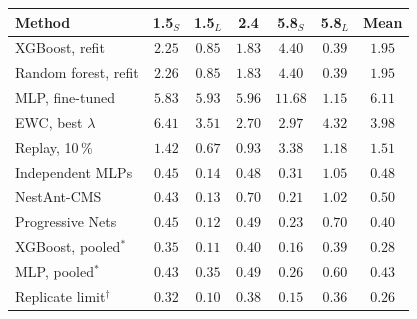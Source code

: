 \begin{tabular}{@{}lcccccc@{}}
\toprule
Method & 1.5$_S$ & 1.5$_L$ & 2.4 & 5.8$_S$ & 5.8$_L$ & Mean \\
\midrule
XGBoost, refit & $2.25$ & $0.85$ & $1.83$ & $4.40$ & $0.39$ & $1.95$ \\
Random forest, refit & $2.26$ & $0.85$ & $1.83$ & $4.40$ & $0.39$ & $1.95$ \\
MLP, fine-tuned & $5.83$ & $5.93$ & $5.96$ & $11.68$ & $1.15$ & $6.11$ \\
EWC, best $\lambda$ & $6.41$ & $3.51$ & $2.70$ & $2.97$ & $4.32$ & $3.98$ \\
Replay, 10\,\% & $1.42$ & $0.67$ & $0.93$ & $3.38$ & $1.18$ & $1.51$ \\
Independent MLPs & $0.45$ & $0.14$ & $0.48$ & $0.31$ & $1.05$ & $0.48$ \\
NestAnt-CMS & $0.43$ & $0.13$ & $0.70$ & $0.21$ & $1.02$ & $0.50$ \\
Progressive Nets & $0.45$ & $0.12$ & $0.49$ & $0.23$ & $0.70$ & $0.40$ \\
\midrule
XGBoost, pooled$^\ast$ & $0.35$ & $0.11$ & $0.40$ & $0.16$ & $0.39$ & $0.28$ \\
MLP, pooled$^\ast$ & $0.43$ & $0.35$ & $0.49$ & $0.26$ & $0.60$ & $0.43$ \\
\midrule
Replicate limit$^\dagger$ & $0.32$ & $0.10$ & $0.38$ & $0.15$ & $0.36$ & $0.26$ \\
\bottomrule
\end{tabular}
